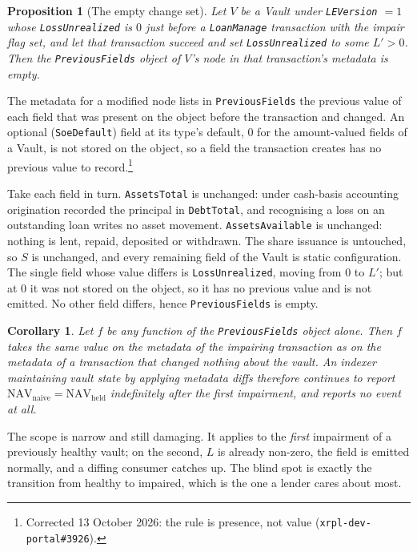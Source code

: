 \documentclass[11pt]{article}
\makeatletter
\theoremstyle{orma}
\newtheorem{proposition}[theorem]{Proposition}
\newtheorem{corollary}[theorem]{Corollary}
\theoremstyle{ormaupright}
\renewenvironment{proof}[1][\proofname]{%
  \par\addvspace{5pt}%
  \pushQED{\qed}%
  \normalfont
  \list{}{\leftmargin=1.8em \rightmargin=0pt \topsep=0pt
          \parsep=\parskip \itemsep=0pt \labelwidth=0pt \labelsep=0pt}%
  \item[]\relax
  {\itshape #1\@addpunct{.}}\hspace{0.75em}\ignorespaces
}{%
  \popQED\endlist\@endpefalse\addvspace{5pt}%
}
\makeatother
\begin{document}
\begin{proposition}[The empty change set]
\label{prop:empty}
Let $V$ be a Vault under \texttt{LEVersion} $=1$ whose \texttt{LossUnrealized} is $0$ just
before a \texttt{LoanManage} transaction with the impair flag set, and let that transaction
succeed and set \texttt{LossUnrealized} to some $L' > 0$. Then the \texttt{PreviousFields}
object of $V$'s node in that transaction's metadata is empty.
\end{proposition}

\begin{proof}
The metadata for a modified node lists in \texttt{PreviousFields} the previous value of
each field that was present on the object before the transaction and changed. An optional (\texttt{SoeDefault}) field at
its type's default, $0$ for the amount-valued fields of a Vault, is not stored on the
object, so a field the transaction creates has no previous value to record.\footnote{Corrected
13 October 2026: the rule is presence, not value (\texttt{xrpl-dev-portal\#3926}).}

Take each field in turn. \texttt{AssetsTotal} is unchanged: under cash-basis accounting
origination recorded the principal in \texttt{DebtTotal}, and recognising a loss on an
outstanding loan writes no asset movement. \texttt{AssetsAvailable} is unchanged: nothing is
lent, repaid, deposited or withdrawn. The share issuance is untouched, so $S$ is unchanged,
and every remaining field of the Vault is static configuration. The single field whose value
differs is \texttt{LossUnrealized}, moving from $0$ to $L'$; but at $0$ it was not stored
on the object, so it has no previous value and is not emitted. No other field differs, hence
\texttt{PreviousFields} is empty.
\end{proof}

\begin{corollary}
\label{cor:blind}
Let $f$ be any function of the \texttt{PreviousFields} object alone. Then $f$ takes the same
value on the metadata of the impairing transaction as on the metadata of a transaction that
changed nothing about the vault. An indexer maintaining vault state by applying metadata
diffs therefore continues to report
$\mathrm{NAV}_{\mathrm{naive}} = \mathrm{NAV}_{\mathrm{held}}$ indefinitely after the first
impairment, and reports no event at all.
\end{corollary}

The scope is narrow and still damaging. It applies to the \emph{first} impairment of a
previously healthy vault; on the second, $L$ is already non-zero, the field is emitted
normally, and a diffing consumer catches up. The blind spot is exactly the transition from
healthy to impaired, which is the one a lender cares about most.
\end{document}
